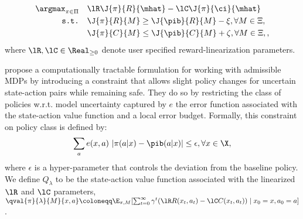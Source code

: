 \begin{align}
\label{eq:spibb-robust-formulation}
    \argmax_{\pi \in \Pi} &\quad \lR \J{\pi}{R}{\mhat}  - \lC \J{\pi}{\ci}{\mhat}  \\ 
    \texttt{s.t.} &\quad \J{\pi}{R}{M} \geq \J{\pib}{R}{M} - \xi, \forall M \in \Xi, \nonumber \\
    &\quad \J{\pi}{C}{M} \leq \J{\pib}{C}{M} + \zeta,   \forall M \in \Xi, \nonumber,
\end{align}
where $\lR ,\lC \in \Real_{\ge 0}$ denote user specified reward-linearization parameters. 


\citet{nadjahi2019safe} propose a computationally tractable formulation for working with admissible MDPs by introducing a constraint that allows slight policy changes for uncertain state-action pairs while remaining safe. They do so by restricting the class of policies w.r.t. model uncertainty captured by $e$ the error function associated with the state-action value function and a local error budget. Formally, this constraint on policy class is defined by:
\begin{equation}
\label{eq:spibb-policy-constraint}
    \sum_a e(x,a)\ |\pi(a|x) - \pib(a|x)| \leq \epsilon,  \forall x \in \X,
\end{equation}
where $\epsilon$ is a hyper-parameter that controls the deviation from the baseline policy.
We define $Q_{\lambda}$ to be the state-action value function associated with the linearized $\lR$ and $\lC$ parameters, $\qval{\pi}{\lambda}{M}{x,a} \coloneqq \E_{\pi, M} [ \sum_{t=0}^{\infty} \gamma^t ( \lR R(x_t,a_t) - \lC C(x_t,a_t)) \mid  x_0 = x, a_0 = a ]$.

